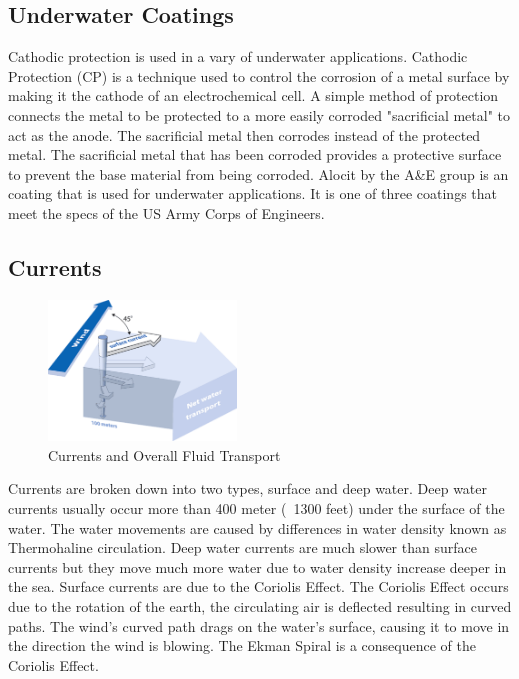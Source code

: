 \documentclass{report}
\begin{document}
\subsection{Underwater Coatings}
Cathodic protection is used in a vary of underwater applications. Cathodic Protection (CP) is a technique used to control the corrosion of a metal surface by making it the cathode of an electrochemical cell. A simple method of protection connects the metal to be protected to a more easily corroded "sacrificial metal" to act as the anode. The sacrificial metal then corrodes instead of the protected metal. The sacrificial metal that has been corroded provides a protective surface to prevent the base material from being corroded. Alocit by the A\&E group is an coating that is used for underwater applications. It is one of three coatings that meet the specs of the US Army Corps of Engineers.
\subsection{Currents}
\begin{figure}[h]
\centering
\includegraphics[width=5cm]{"Currents"}
\caption{Currents and Overall Fluid Transport}
\end{figure}
Currents are broken down into two types, surface and deep water. Deep water currents usually occur more than 400 meter (~1300 feet) under the surface of the water. The water movements are caused by differences in water density known as Thermohaline circulation. Deep water currents are much slower than surface currents but they move much more water due to water density increase deeper in the sea. Surface currents are due to the Coriolis Effect. The Coriolis Effect occurs due to the rotation of the earth, the circulating air is deflected resulting in curved paths. The wind’s curved path drags on the water’s surface, causing it to move in the direction the wind is blowing. The Ekman Spiral is a consequence of the Coriolis Effect.
\end{document}
